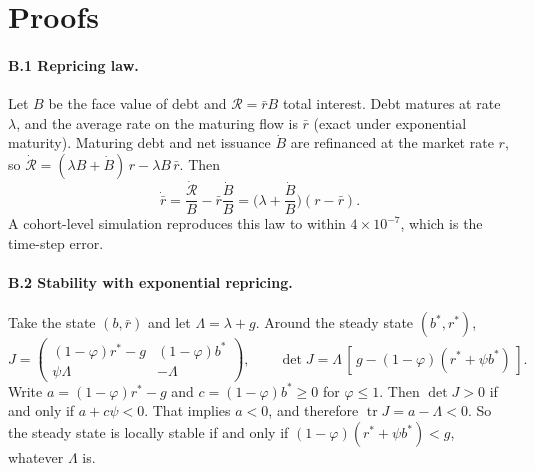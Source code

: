 \section{Proofs}\label{app:proofs}

\paragraph{B.1 Repricing law.} Let $B$ be the face value of debt and $\mathcal R=\bar r B$ total interest. Debt matures at rate $\lambda$, and the average rate on the maturing flow is $\bar r$ (exact under exponential maturity). Maturing debt and net issuance $\dot B$ are refinanced at the market rate $r$, so $\dot{\mathcal R}=(\lambda B+\dot B)\,r-\lambda B\,\bar r$. Then
\begin{equation}
\dot{\bar r}=\frac{\dot{\mathcal R}}{B}-\bar r\frac{\dot B}{B}=\Big(\lambda+\frac{\dot B}{B}\Big)(r-\bar r).
\end{equation}
A cohort-level simulation reproduces this law to within $4\times10^{-7}$, which is the time-step error.

\paragraph{B.2 Stability with exponential repricing.} Take the state $(b,\bar r)$ and let $\Lambda=\lambda+g$. Around the steady state $(b^*,r^*)$,
\begin{equation}
J=\begin{pmatrix}(1-\varphi)r^*-g & (1-\varphi)b^*\\ \psi\Lambda & -\Lambda\end{pmatrix},\qquad \det J=\Lambda\,[\,g-(1-\varphi)(r^*+\psi b^*)\,].
\end{equation}
Write $a=(1-\varphi)r^*-g$ and $c=(1-\varphi)b^*\ge0$ for $\varphi\le1$. Then $\det J>0$ if and only if $a+c\psi<0$. That implies $a<0$, and therefore $\operatorname{tr}J=a-\Lambda<0$. So the steady state is locally stable if and only if $(1-\varphi)(r^*+\psi b^*)<g$, whatever $\Lambda$ is.

